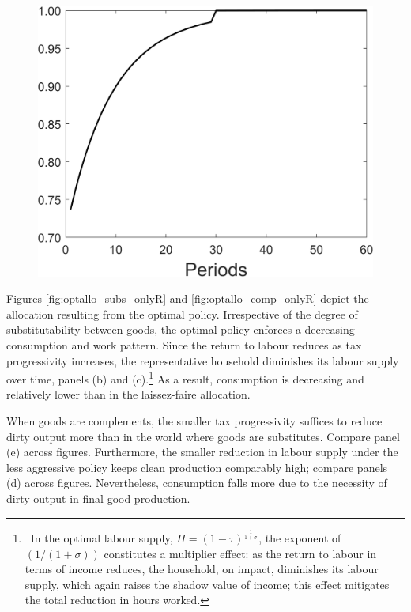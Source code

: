 \begin{figure}[h!!]
\begin{minipage}[]{0.32\textwidth}
\end{minipage}
\begin{minipage}[]{0.32\textwidth}
	\includegraphics[width=1\textwidth]{../../codding_model/Own/figures/Rep_agent/staticRam_LF_separate_tauul_periods59_eppsilon0.40_zeta1.40_Ad08_Ac04_thetac0.70_thetad0.56_HetGrowth1_tauul0.181_util0_withtarget1_lgd0.png}
\end{minipage}
\end{figure}

Figures \ref{fig:optallo_subs_onlyR} and \ref{fig:optallo_comp_onlyR} depict the allocation resulting from the optimal policy.
Irrespective of the degree of substitutability between goods, the optimal policy enforces a decreasing consumption and work pattern.  
Since the return to labour reduces as tax progressivity increases, the representative household diminishes its labour supply over time, panels (b) and (c).\footnote{\ In the optimal labour supply, $H=(1-\tau)^{\frac{1}{1+\sigma}}$, the exponent of $(1/(1+\sigma))$ constitutes a multiplier effect: as the return to labour in terms of income reduces, the household, on impact, diminishes its labour supply, which again raises the shadow value of income; this effect mitigates the total reduction in hours worked.} 
As a result, consumption is  decreasing and relatively lower than in the laissez-faire allocation. 

When goods are complements,  the smaller tax progressivity suffices to reduce dirty output more than in the world where goods are substitutes. Compare panel (e) across figures. Furthermore, the smaller reduction in labour supply under the less aggressive policy keeps clean production comparably high; compare panels (d) across figures. Nevertheless, consumption falls more due to the necessity of dirty output in final good production. 

